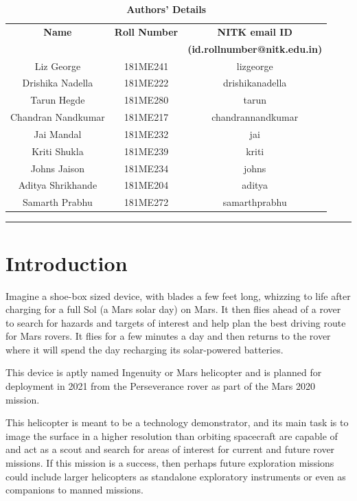 \documentclass[preprint,12pt]{elsarticle}
\begin{document}
\begin{table}[H]
  \begin{center}
    \caption*{\textbf{Authors' Details}}
    \begin{tabular}{c|c|c}
      \textbf{Name} & \textbf{Roll Number} & \textbf{NITK email ID}\\
        & &  \textbf{(id.rollnumber@nitk.edu.in)}\\
      \hline
      Liz George & 181ME241 & lizgeorge\\
      Drishika Nadella & 181ME222 & drishikanadella\\
      Tarun Hegde & 181ME280 & tarun\\
      Chandran Nandkumar & 181ME217 & chandrannandkumar\\
      Jai Mandal & 181ME232 & jai\\
      Kriti Shukla & 181ME239 & kriti\\
      Johns Jaison & 181ME234 & johns\\
      Aditya Shrikhande & 181ME204 & aditya\\
      Samarth Prabhu & 181ME272 & samarthprabhu\\
      
      
    \end{tabular}
  \end{center}
\end{table}





\tableofcontents
\bigskip
\hrule
\section{Introduction}
\label{S:1}


Imagine a shoe-box sized device, with blades a few feet long, whizzing to life after charging for a full Sol (a Mars solar day) on Mars. It then flies ahead of a rover to search for hazards and targets of interest and help plan the best driving route for Mars rovers. It flies for a few minutes a day and then returns to the rover where it will spend the day recharging its solar-powered batteries.\par
This device is aptly named Ingenuity or Mars helicopter and is planned for deployment in 2021 from the Perseverance rover as part of the Mars 2020 mission.\par
This helicopter is meant to be a technology demonstrator, and its main task is to image the surface in a higher resolution than orbiting spacecraft are capable of and act as a scout and search for areas of interest for current and future rover missions. If this mission is a success, then perhaps future exploration missions could include larger helicopters as standalone exploratory instruments or even as companions to manned missions.\par
\end{document}
